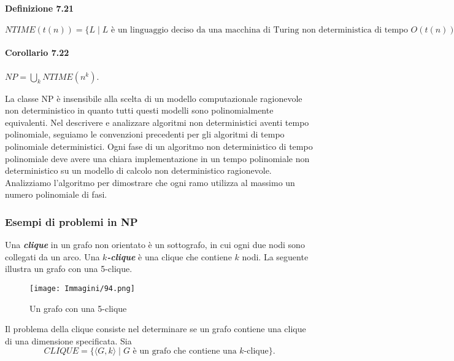 \documentclass{article}
\begin{document}
\paragraph{Definizione 7.21}
\label{definizione-7.21}
\vspace{1em}
\text{}
\newline
\begin{tcolorbox}[colback=yellow!10!white, colframe=yellow!50!black, title=Definizione 7.21]
    $NTIME(t(n)) = \{L \mid L \text{ è un linguaggio deciso da una macchina di Turing non deterministica di tempo } O(t(n))\}$
\end{tcolorbox}
\paragraph{Corollario 7.22}
\label{corollario-7.22}
\vspace{1em}
\text{}
\newline
$NP = \bigcup_{k} NTIME(n^k)$.
\vspace{1em}

La classe NP è insensibile alla scelta di un modello computazionale ragionevole non deterministico in quanto tutti questi modelli sono polinomialmente equivalenti. 
Nel descrivere e analizzare algoritmi non deterministici aventi tempo polinomiale, seguiamo le convenzioni precedenti per gli algoritmi di tempo polinomiale deterministici. 
Ogni fase di un algoritmo non deterministico di tempo polinomiale deve avere una chiara implementazione in un tempo polinomiale non deterministico su un modello di calcolo non deterministico ragionevole. 
Analizziamo l'algoritmo per dimostrare che ogni ramo utilizza al massimo un numero polinomiale di fasi.

\subsubsection{Esempi di problemi in NP}
Una \textit{\textbf{clique}} in un grafo non orientato è un sottografo, in cui ogni due nodi sono collegati da un arco. 
Una \textit{\textbf{$k$-clique}} è una clique che contiene $k$ nodi.
La seguente illustra un grafo con una 5-clique.
\begin{figure}[H]
    \centering
    \texttt{[image: Immagini/94.png]}
    \caption{Un grafo con una 5-clique}
    \label{fig:5-clique}
\end{figure}
Il problema della clique consiste nel determinare se un grafo contiene una clique di una dimensione specificata. 
Sia
$$
CLIQUE = \{ \langle G, k \rangle \mid G \text{ è un grafo che contiene una $k$-clique} \}.
$$
\end{document}

